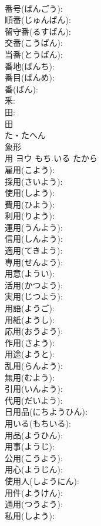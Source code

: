 \documentclass[8pt]{extreport}
\begin{document}
\begin{CJK}{UTF8}{min}
\\	番号(ばんごう): 
\\	順番(じゅんばん): 
\\	留守番(るすばん): 
\\	交番(こうばん): 
\\	当番(とうばん): 
\\	番地(ばんち): 
\\	番目(ばんめ): 
\\	番(ばん): 
\\	釆: 
\\	田: 
\\	田	
\\	た・たへん	
\\	象形 
\\	用	ヨウ	もち.いる	たから	
\\	雇用(こよう): 
\\	採用(さいよう): 
\\	使用(しよう): 
\\	費用(ひよう): 
\\	利用(りよう): 
\\	運用(うんよう): 
\\	信用(しんよう): 
\\	適用(てきよう): 
\\	専用(せんよう): 
\\	用意(ようい): 
\\	活用(かつよう): 
\\	実用(じつよう): 
\\	用語(ようご): 
\\	用紙(ようし): 
\\	応用(おうよう): 
\\	作用(さよう): 
\\	用途(ようと): 
\\	乱用(らんよう): 
\\	無用(むよう): 
\\	引用(いんよう): 
\\	代用(だいよう): 
\\	日用品(にちようひん): 
\\	用いる(もちいる): 
\\	用品(ようひん): 
\\	用事(ようじ): 
\\	公用(こうよう): 
\\	用心(ようじん): 
\\	使用人(しようにん): 
\\	用件(ようけん): 
\\	通用(つうよう): 
\\	私用(しよう): 

\end{CJK}
\end{document}
